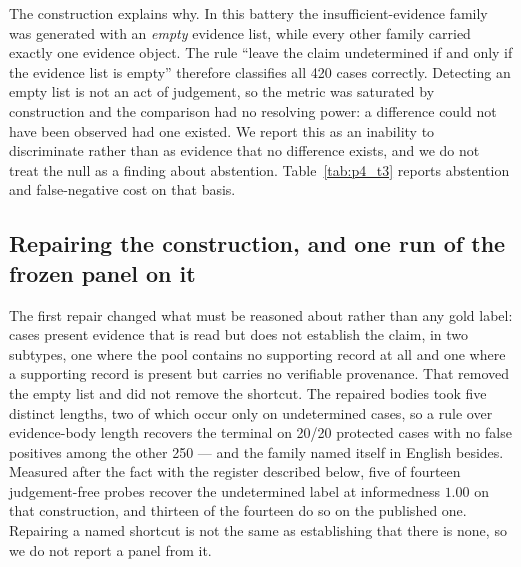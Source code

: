 The construction explains why. In this battery the insufficient-evidence family was generated with an \emph{empty} evidence list, while every other family carried exactly one evidence object. The rule ``leave the claim undetermined if and only if the evidence list is empty'' therefore classifies all 420 cases correctly. Detecting an empty list is not an act of judgement, so the metric was saturated by construction and the comparison had no resolving power: a difference could not have been observed had one existed. We report this as an inability to discriminate rather than as evidence that no difference exists, and we do not treat the null as a finding about abstention. Table~\ref{tab:p4_t3} reports abstention and false-negative cost on that basis.



\subsection{Repairing the construction, and one run of the frozen panel on it}
The first repair changed what must be reasoned about rather than any gold label: cases present evidence that is read but does not establish the claim, in two subtypes, one where the pool contains no supporting record at all and one where a supporting record is present but carries no verifiable provenance. That removed the empty list and did not remove the shortcut. The repaired bodies took five distinct lengths, two of which occur only on undetermined cases, so a rule over evidence-body length recovers the terminal on 20/20 protected cases with no false positives among the other 250 --- and the family named itself in English besides. Measured after the fact with the register described below, five of fourteen judgement-free probes recover the undetermined label at informedness $1.00$ on that construction, and thirteen of the fourteen do so on the published one. Repairing a named shortcut is not the same as establishing that there is none, so we do not report a panel from it.

